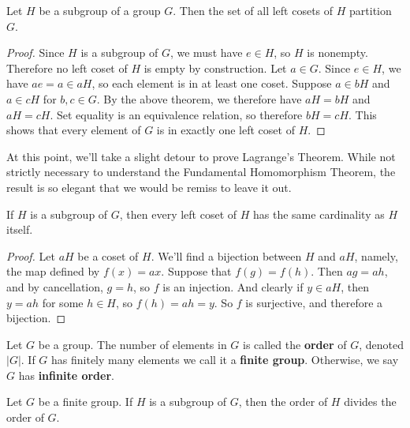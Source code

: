 \begin{theorem}
\label{cosetpartition}
Let $H$ be a subgroup of a group $G$. Then the set of all left cosets of $H$ partition $G$.
\end{theorem}

\begin{proof}
Since $H$ is a subgroup of $G$, we must have $e \in H$, so $H$ is nonempty. Therefore no left coset of $H$ is empty by construction. Let $a \in G$. Since $e \in H$, we have $ae = a \in aH$, so each element is in at least one coset. Suppose $a \in bH$ and $a \in cH$ for $b, c \in G$. By the above theorem, we therefore have $aH = bH$ and $aH = cH$. Set equality is an equivalence relation, so therefore $bH = cH$. This shows that every element of $G$ is in exactly one left coset of $H$.

\end{proof}

At this point, we'll take a slight detour to prove Lagrange's Theorem. While not strictly necessary to understand the Fundamental Homomorphism Theorem, the result is so elegant that we would be remiss to leave it out.

\begin{theorem}
\label{cosetsize}
If \extra $H$ is a subgroup of $G$, then every left coset of $H$ has the same cardinality as $H$ itself.
\end{theorem}

\begin{proof}
Let $aH$ be a coset of $H$. We'll find a bijection between $H$ and $aH$, namely, the map defined by $f(x) = ax$. Suppose that $f(g) = f(h)$. Then $ag = ah$, and by cancellation, $g=h$, so $f$ is an injection. And clearly if $y \in aH$, then $y = ah$ for some $h \in H$, so $f(h) = ah = y$. So $f$ is surjective, and therefore a bijection.
\end{proof}

\begin{definition}
Let \extra $G$ be a group. The number of elements in $G$ is called the \textbf{order} of $G$, denoted $|G|$. If $G$ has finitely many elements we call it a \textbf{finite group}. Otherwise, we say $G$ has \textbf{infinite order}.
\end{definition}

\begin{theorem}
Let \extra $G$ be a finite group. If $H$ is a subgroup of $G$, then the order of $H$ divides the order of $G$.
\end{theorem}

